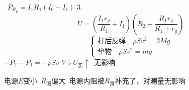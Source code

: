 \ $P_{R_p}=I_1R_1(I_0-I_1)$ %
3.
\[
U=\left(\frac{I_1r_g}{R_1}+I_1\right)\left(R_2+\frac{R_1r_g}{R_1+r_g}\right)
\]
\[
\begin{cases}
\text{打后反弹}\quad \rho Sv^2=2Mg\\
\text{垫物}\quad \rho Sv^2=mg
\end{cases}
\]
$-P_2-P_1=-\rho Sv$ %
\quad $V\downarrow$\qquad $U_{\text{实}}\uparrow$\ 无影响 %

电源$E$变小\ $R_{\text{测}}$偏大\ 电源内阻被$R_{\text{滑}}$补充了，对测量无影响
